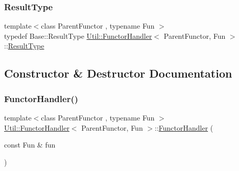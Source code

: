 \mbox{\label{classUtil_1_1FunctorHandler_a036da44b8cc2567704cebd2a20d16c80}} 
\subsubsection{\texorpdfstring{ResultType}{ResultType}\hspace{0.1cm}{\footnotesize\ttfamily [3/3]}}
{\footnotesize\ttfamily template$<$class Parent\+Functor , typename Fun $>$ \\
typedef Base\+::\+Result\+Type \mbox{\hyperlink{classUtil_1_1FunctorHandler}{Util\+::\+Functor\+Handler}}$<$ Parent\+Functor, Fun $>$\+::\mbox{\hyperlink{classUtil_1_1FunctorHandler_a036da44b8cc2567704cebd2a20d16c80}{Result\+Type}}}



\subsection{Constructor \& Destructor Documentation}
\mbox{\label{classUtil_1_1FunctorHandler_aa8b8cd815a79a27be8585210d8dccdb5}} 
\subsubsection{\texorpdfstring{FunctorHandler()}{FunctorHandler()}\hspace{0.1cm}{\footnotesize\ttfamily [1/3]}}
{\footnotesize\ttfamily template$<$class Parent\+Functor , typename Fun $>$ \\
\mbox{\hyperlink{classUtil_1_1FunctorHandler}{Util\+::\+Functor\+Handler}}$<$ Parent\+Functor, Fun $>$\+::\mbox{\hyperlink{classUtil_1_1FunctorHandler}{Functor\+Handler}} (\begin{DoxyParamCaption}\item[{const Fun \&}]{fun }\end{DoxyParamCaption})\hspace{0.3cm}{\ttfamily [inline]}}

